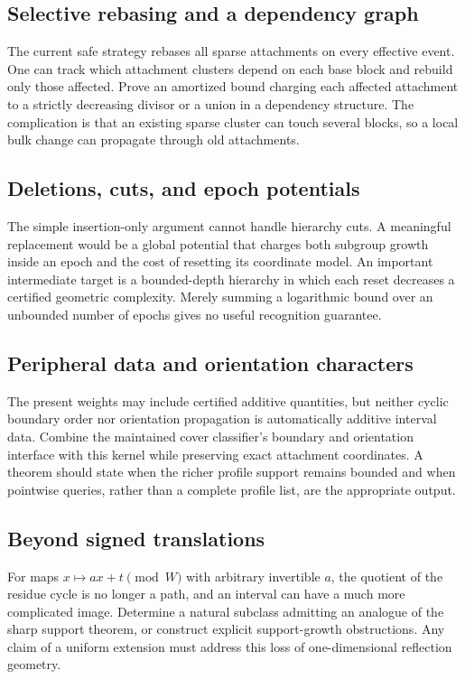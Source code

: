 \documentclass[11pt]{article}
\theoremstyle{definition}
\begin{document}
\subsection{Selective rebasing and a dependency graph}
The current safe strategy rebases all sparse attachments on every effective event. One can track which attachment clusters depend on each base block and rebuild only those affected. Prove an amortized bound charging each affected attachment to a strictly decreasing divisor or a union in a dependency structure. The complication is that an existing sparse cluster can touch several blocks, so a local bulk change can propagate through old attachments.

\subsection{Deletions, cuts, and epoch potentials}
The simple insertion-only argument cannot handle hierarchy cuts. A meaningful replacement would be a global potential that charges both subgroup growth inside an epoch and the cost of resetting its coordinate model. An important intermediate target is a bounded-depth hierarchy in which each reset decreases a certified geometric complexity. Merely summing a logarithmic bound over an unbounded number of epochs gives no useful recognition guarantee.

\subsection{Peripheral data and orientation characters}
The present weights may include certified additive quantities, but neither cyclic boundary order nor orientation propagation is automatically additive interval data. Combine the maintained cover classifier's boundary and orientation interface with this kernel while preserving exact attachment coordinates. A theorem should state when the richer profile support remains bounded and when pointwise queries, rather than a complete profile list, are the appropriate output.

\subsection{Beyond signed translations}
For maps $x\mapsto ax+t\pmod W$ with arbitrary invertible $a$, the quotient of the residue cycle is no longer a path, and an interval can have a much more complicated image. Determine a natural subclass admitting an analogue of the sharp support theorem, or construct explicit support-growth obstructions. Any claim of a uniform extension must address this loss of one-dimensional reflection geometry.
\end{document}
